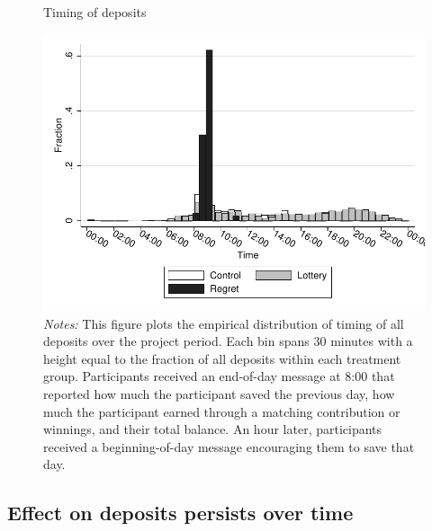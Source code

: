 \documentclass[11pt]{article}
\begin{document}
		\begin{figure}[ht]
		\centering
		\caption{Timing of deposits}
		\includegraphics[width=\textwidth]{../../figures/hist-deposits.pdf}
		\caption*{\footnotesize \emph{Notes:} This figure plots the empirical distribution of timing of all deposits over the project period. Each bin spans 30 minutes with a height equal to the fraction of all deposits within each treatment group. Participants received an end-of-day message at 8:00 that reported how much the participant saved the previous day, how much the participant earned through a matching contribution or winnings, and their total balance. An hour later, participants received a beginning-of-day message encouraging them to save that day.}
		\end{figure}

		\clearpage

	\subsection{Effect on deposits persists over time}


		
\end{document}
